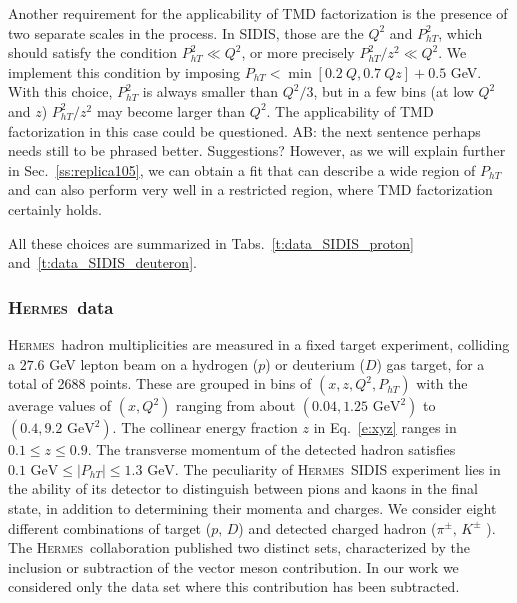 \documentclass[aps,preprintnumbers,showpacs,nofootinbib,superscriptaddress,floatfix]{revtex4}
\newcommand{\AS}[1]{{\textcolor[rgb]{1,0,1}{#1}}}
\newcommand{\hermes}{\textsc{Hermes}}
\begin{document}
Another requirement for the applicability of TMD factorization is the presence
of two separate scales in the process. In SIDIS, those are the $Q^2$ and
$P_{hT}^2$, which should satisfy the condition $P_{hT}^2 \ll Q^2$, or more
precisely  $P_{hT}^2/z^2 \ll Q^2$. 
We implement this condition by imposing 
$P_{hT} < \min[0.2\ Q, 0.7\ Qz] + 0.5$ GeV.
With this choice, $P_{hT}^2$ is always smaller than $Q^2/3$, but in a few 
bins (at low $Q^2$ and $z$) $P_{hT}^2/z^2$ may become larger
than $Q^2$. The applicability of TMD factorization in this case could be
questioned. 
\AS{AB: the next sentence perhaps needs still to be phrased better. Suggestions?}
However, as we will explain further in Sec.~\ref{ss:replica105},
we can obtain a fit that can describe a wide region of $P_{hT}$ and can also
perform very well in a restricted region,  where TMD factorization
certainly holds.

All these choices are summarized in Tabs.~\ref{t:data_SIDIS_proton} and~\ref{t:data_SIDIS_deuteron}.

\subsubsection{\hermes\ data}
\label{sss:hermes}

\hermes\ hadron multiplicities are measured in a fixed target experiment,
colliding a $27.6$ GeV lepton beam on a hydrogen ($p$) or deuterium ($D$) gas
target, for a total of 2688 points.
These are grouped in bins of $(x,z,Q^2,P_{hT})$ with the average values of $(x,Q^2)$ ranging from about $(0.04, 1.25\text{ GeV}^2)$ to $(0.4, 9.2\text{ GeV}^2)$. 
The collinear energy fraction $z$ in Eq.~\eqref{e:xyz} ranges in $0.1\leq z\leq 0.9$. The transverse momentum of the detected hadron satisfies $0.1 \text{ GeV} \leq \vert P_{hT} \vert \leq 1.3 \text{ GeV}$.
The peculiarity of \hermes\ SIDIS experiment lies in the ability of its detector to distinguish between pions and kaons in the final state, in addition to determining their momenta and charges.
We consider eight different 
combinations of target ($p,\,D$) and detected
charged hadron ($\pi^\pm, \,  K^\pm$ ). The
\hermes\ collaboration published two distinct sets, characterized by the inclusion or subtraction of the vector meson contribution. In our work we considered only the data set where this contribution has been subtracted. 
\end{document}
